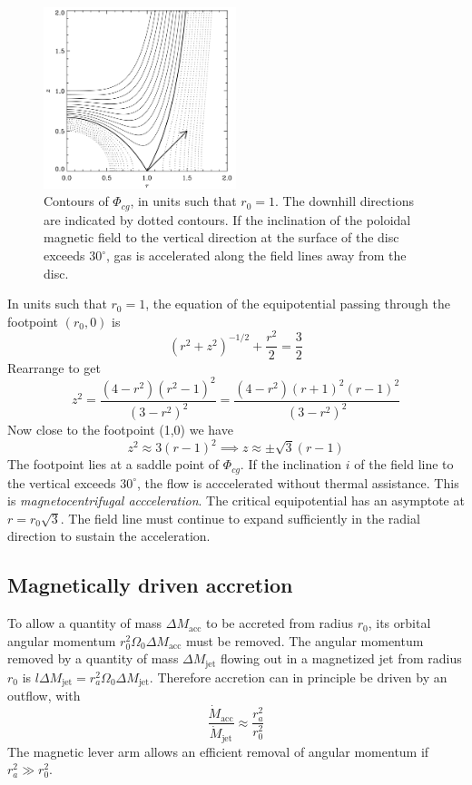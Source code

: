 \documentclass{jknotes}
\begin{document}
\begin{figure}[h]
	\centering
	\includegraphics[width=0.5\textwidth]{outflow.png}
	\caption{Contours of $\Phi_{cg}$, in units such that $r_0 = 1$. The
		downhill directions are indicated by dotted contours. If the
		inclination of the poloidal magnetic field to the vertical direction
		at the surface of the disc exceeds $30^{\circ}$, gas is accelerated
	along the field lines away from the disc.}
\end{figure}

In units such that $r_0 =1$, the equation of the equipotential passing through
the footpoint $(r_0,0)$ is
\begin{equation}
	(r^2 + z^2)^{-1/2} + \frac{r^2}{2} = \frac{3}{2}
\end{equation}
Rearrange to get
\begin{equation}
	z^2 = \frac{(4-r^2)(r^2-1)^2}{(3-r^2)^2} =
	\frac{(4-r^2)(r+1)^2(r-1)^2}{(3-r^2)^2}
\end{equation}
Now close to the footpoint (1,0) we have
\begin{equation}
	z^2 \approx 3(r-1)^2 \implies z \approx \pm \sqrt{3}(r-1)
\end{equation}
The footpoint lies at a saddle point of $\Phi_{cg}$. If the inclination $i$ of
the field line to the vertical exceeds $30^{\circ}$, the flow is acccelerated
without thermal assistance. This is \emph{magnetocentrifugal accceleration}.
The critical equipotential has an asymptote at $r=r_0\sqrt{3}$. The field line
must continue to expand sufficiently in the radial direction to sustain the
acceleration.

\subsection{Magnetically driven accretion}
To allow a quantity of mass $\Delta M_{\text{acc}}$ to be accreted from radius
$r_0$, its orbital angular momentum $r_0^2 \Omega_0 \Delta M_{\text{acc}}$
must be removed. The angular momentum removed by a quantity of mass $\Delta
M_{\text{jet}}$ flowing out in a magnetized jet from radius $r_0$ is
$l\Delta M_{\text{jet}} = r_a^2 \Omega_0 \Delta M_{\text{jet}}$. Therefore
accretion can in principle be driven by an outflow, with
\begin{equation}
	\frac{\dot{M}_{\text{acc}}}{\dot{M}_{\text{jet}}} \approx
	\frac{r_a^2}{r_0^2}
\end{equation}
The magnetic lever arm allows an efficient removal of angular momentum if
$r_a^2 \gg r_0^2$. 
\end{document}
